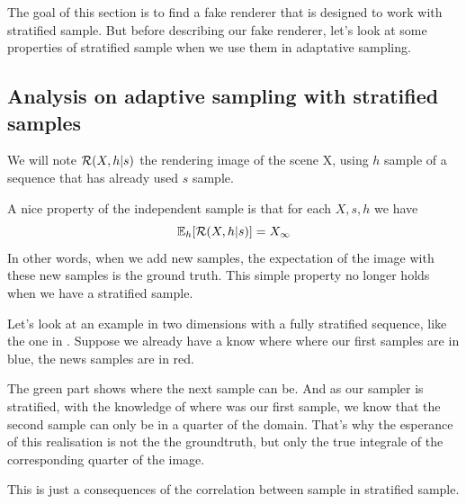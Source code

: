 \documentclass{classeENS}
\begin{document}
The goal of this section is to find a fake renderer that is designed to work
with stratified sample. But before describing our fake renderer, let's look at
some properties of stratified sample when we use them in adaptative sampling.

\subsection{Analysis on adaptive sampling with stratified samples}

We will note $\mathcal R(X, h | s)$ the rendering image of the scene X, using $h$ sample of
a sequence that has already used $s$ sample.

\par A nice property of the independent sample is that for each $X,s,h$ we have
\[ \mathbb E_h[\mathcal R(X,h | s)] = X_\infty \]
In other words, when we add new samples, the expectation of the image 
with these new samples is the ground truth. This simple property no 
longer holds when we have a stratified sample.
\par Let's look at an example in two dimensions with a fully stratified 
sequence, like the one in \cite{10.2312:sr.20211287}. Suppose we already 
have a know where where our first samples are in blue, the news samples 
are in red.

\begin{center}
\end{center}
The green part shows where the next sample can be. And as our sampler is stratified,
with the knowledge of where was our first sample, we know that the second sample can only
be in a quarter of the domain. That's why the esperance of this realisation is not the
the groundtruth, but only the true integrale of the corresponding quarter of the image.
\par This is just a consequences of the correlation between sample in stratified sample.
\end{document}
